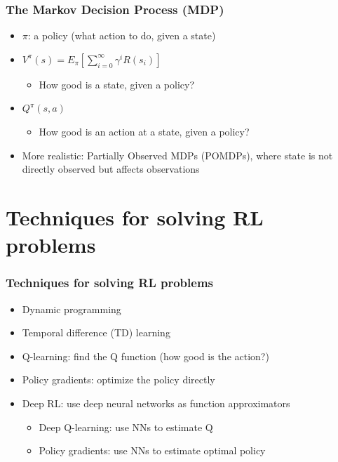 \documentclass{beamer}
\begin{document}
\begin{frame}
  \frametitle{The Markov Decision Process (MDP)}
  \begin{itemize}
    \item $\pi$: a policy (what action to do, given a state)
    \item $V^\pi(s) = E_\pi[\sum_{i=0}^\infty \gamma^i R(s_i)]$
    \begin{itemize}
      \item How good is a state, given a policy?
    \end{itemize}
  \item $Q^\pi(s, a)$
    \begin{itemize}
      \item How good is an action at a state, given a policy?
    \end{itemize}
  \item More realistic: Partially Observed MDPs (POMDPs), where state is not directly observed but affects observations
  \end{itemize}

\end{frame}

\section{Techniques for solving RL problems}

\begin{frame}
  \frametitle{Techniques for solving RL problems}
  \begin{itemize}
      \item Dynamic programming
      \item Temporal difference (TD) learning
      \item Q-learning: find the Q function (how good is the action?)
      \item Policy gradients: optimize the policy directly
      \item Deep RL: use deep neural networks as function approximators

        \begin{itemize}
          \item Deep Q-learning: use NNs to estimate Q
          \item Policy gradients: use NNs to estimate optimal policy
        \end{itemize}
  \end{itemize}
\end{frame}
\end{document}
